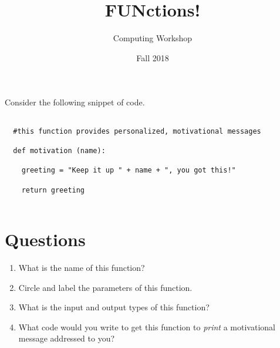 \documentclass[11pt]{article}
\author{Computing Workshop}
\title{FUNctions!}
\date{Fall 2018}
\begin{document}
\maketitle

Consider the following snippet of code.
\begin{lstlisting}

  #this function provides personalized, motivational messages

  def motivation (name):

    greeting = "Keep it up " + name + ", you got this!"

    return greeting


\end{lstlisting}

\section*{Questions}
\begin{enumerate}
\item
  What is the name of this function?
  \vspace{2em}

\item
  Circle and label the parameters of this function.

\item
  What is the input and output types of this function?
  \vspace{2em}

\item
  What code would you write to get this function to \emph{print} a motivational message addressed to you?
  \vspace{4em}

\end{enumerate}
\end{document}
